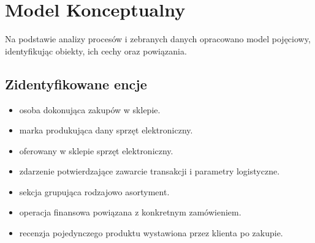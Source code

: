 \documentclass[letterpaper,10pt,polish]{sphinxmanual}
\begin{document}
\section{Model Konceptualny}
\label{\detokenize{rozdzia_u0142_3/BD_PlanBazyDanych_zad1/index:model-konceptualny}}
\sphinxAtStartPar
Na podstawie analizy procesów i zebranych danych opracowano model pojęciowy, identyfikując obiekty, ich cechy oraz powiązania.


\subsection{Zidentyfikowane encje}
\label{\detokenize{rozdzia_u0142_3/BD_PlanBazyDanych_zad1/index:zidentyfikowane-encje}}\begin{itemize}
\item {} 
\sphinxAtStartPar
{} \sphinxhyphen{} osoba dokonująca zakupów w sklepie.

\item {} 
\sphinxAtStartPar
{} \sphinxhyphen{} marka produkująca dany sprzęt elektroniczny.

\item {} 
\sphinxAtStartPar
{} \sphinxhyphen{} oferowany w sklepie sprzęt elektroniczny.

\item {} 
\sphinxAtStartPar
{} \sphinxhyphen{} zdarzenie potwierdzające zawarcie transakcji i parametry logistyczne.

\item {} 
\sphinxAtStartPar
{} \sphinxhyphen{} sekcja grupująca rodzajowo asortyment.

\item {} 
\sphinxAtStartPar
{} \sphinxhyphen{} operacja finansowa powiązana z konkretnym zamówieniem.

\item {} 
\sphinxAtStartPar
{} \sphinxhyphen{} recenzja pojedynczego produktu wystawiona przez klienta po zakupie.

\end{itemize}
\end{document}
